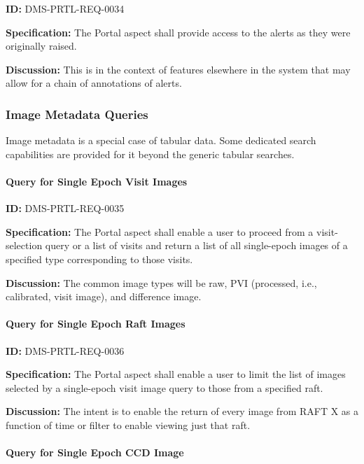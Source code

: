 \documentclass[SE,toc]{lsstdoc}
\begin{document}
\label{DMS-PRTL-REQ-0034}
\textbf{ID:} DMS-PRTL-REQ-0034

\textbf{Specification:}
The Portal aspect shall provide access to the alerts as they were originally raised.

\textbf{Discussion:}
This is in the context of features elsewhere in the system that may allow for a chain of annotations of alerts.

\subsubsection{Image Metadata Queries}

Image metadata is a special case of tabular data.  Some dedicated search capabilities are provided for it beyond the generic tabular searches.

\paragraph{Query for Single Epoch Visit Images}\hfill  %

\label{DMS-PRTL-REQ-0035}
\textbf{ID:} DMS-PRTL-REQ-0035

\textbf{Specification:}
The Portal aspect shall enable a user to proceed from a visit-selection query or a list of visits and return a list of all single-epoch images of a specified type corresponding to those visits.

\textbf{Discussion:}
The common image types will be raw, PVI (processed, i.e., calibrated, visit image), and difference image.

\paragraph{Query for Single Epoch Raft Images}\hfill  %

\label{DMS-PRTL-REQ-0036}
\textbf{ID:} DMS-PRTL-REQ-0036

\textbf{Specification:}
The Portal aspect shall enable a user to limit the list of images selected by a single-epoch visit image query to those from a specified raft.

\textbf{Discussion:}
The intent is to enable the return of every image from RAFT X as a function of time or filter to enable viewing just that raft.

\paragraph{Query for Single Epoch CCD Image}\hfill  %
\end{document}

